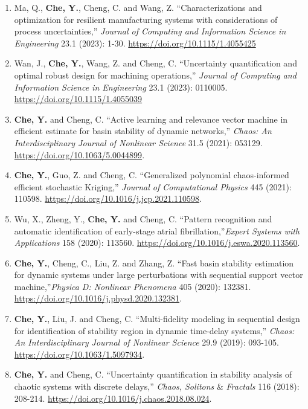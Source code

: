 \documentclass[10pt]{article}
\begin{document}
\begin{enumerate}
	\item Ma, Q., {\bf Che, Y.}, Cheng, C. and Wang, Z. ``Characterizations and optimization for resilient manufacturing systems with considerations of process uncertainties,'' \textit{Journal of Computing and Information Science in Engineering} 23.1 (2023): 1-30. \url{ https://doi.org/10.1115/1.4055425}

	\item Wan, J., {\bf Che, Y.}, Wang, Z. and Cheng, C. ``Uncertainty quantification and optimal robust design for machining operations,'' \textit{Journal of Computing and Information Science in Engineering} 23.1 (2023): 0110005. \url{https://doi.org/10.1115/1.4055039}

	\item {\bf Che, Y.} and Cheng, C. ``Active learning and relevance vector machine in efficient estimate for basin stability of dynamic networks,'' \textit{Chaos: An Interdisciplinary Journal of Nonlinear Science} 31.5 (2021): 053129. \url{https://doi.org/10.1063/5.0044899}.

	\item {\bf Che, Y.}, Guo, Z. and Cheng, C. ``Generalized polynomial chaos-informed efficient stochastic Kriging,'' \textit{Journal of Computational Physics} 445 (2021): 110598. \url{https://doi.org/10.1016/j.jcp.2021.110598}.

	\item Wu, X., Zheng, Y., {\bf Che, Y.} and Cheng, C. ``Pattern recognition and automatic identification of early-stage atrial fibrillation,''\textit{Expert Systems with Applications} 158 (2020): 113560. \url{https://doi.org/10.1016/j.eswa.2020.113560}.

	\item {\bf Che, Y.}, Cheng, C., Liu, Z. and Zhang, Z. ``Fast basin stability estimation for dynamic systems under large perturbations with sequential support vector machine,''\textit{Physica D: Nonlinear Phenomena} 405 (2020): 132381. \url{https://doi.org/10.1016/j.physd.2020.132381}.

	\item {\bf Che, Y.}, Liu, J.  and Cheng, C. ``Multi-fidelity modeling in sequential design for identification of stability region in dynamic time-delay systems,''  \textit{Chaos: An Interdisciplinary Journal of Nonlinear Science} 29.9 (2019): 093-105. \url{https://doi.org/10.1063/1.5097934}.

	\item {\bf Che, Y.} and Cheng, C. ``Uncertainty quantification in stability analysis of chaotic systems with discrete delays,'' \textit{Chaos, Solitons} \& \textit{Fractals} 116 (2018): 208-214. \url{https://doi.org/10.1016/j.chaos.2018.08.024}.
\end{enumerate}
\end{document}
